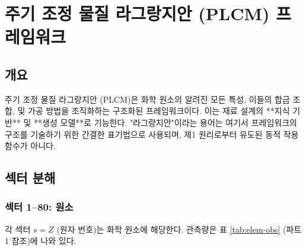\documentclass[12pt,a4paper]{article}
\begin{document}
\begin{landscape}
		\vspace{0.2cm}
		\noindent{}
		
		\vspace{0.2cm}
		\noindent\makebox[\linewidth]{%
			\scalebox{0.75}{%
				$\displaystyle
				+
				\underbrace{\lambda_{131} L_{131}^{\text{CALPHAD}}}_{\text{CALPHAD 통합}}
				+
				\underbrace{\sum_{s=1}^{80} \kappa_{s,131}^{\text{el-CALPHAD}} \,\mathrm{Tr}(\Psi_{s,131} O_s^{\text{el}} O_{131}^{\text{CALPHAD}\dagger})}_{\text{원소–CALPHAD 결합}}
				\Bigg]
				\times \prod_{i=1}^{155} \Theta(P_i - P_{i,\text{crit}})
				$
			}
		}
		\label{fig:full-lagrangian}
	\end{landscape}
	
	\section{주기 조정 물질 라그랑지안 (PLCM) 프레임워크}
	
	\subsection{개요}
	
	주기 조정 물질 라그랑지안 (PLCM)은 화학 원소의 알려진 모든 특성, 이들의 합금 조합, 및 가공 방법을 조직화하는 구조화된 프레임워크이다. 이는 재료 설계의 **지식 기반** 및 **생성 모델**로 기능한다. "라그랑지안"이라는 용어는 여기서 프레임워크의 구조를 기술하기 위한 간결한 표기법으로 사용되며, 제1 원리로부터 유도된 동적 작용 함수가 아니다.
	
	\subsection{섹터 분해}
	
	\subsubsection{섹터 1–80: 원소}
	각 섹터 \(s = Z\) (원자 번호)는 화학 원소에 해당한다. 관측량은 표 \ref{tab:elem-obs} (파트 1 참조)에 나와 있다.
	
\end{document}
